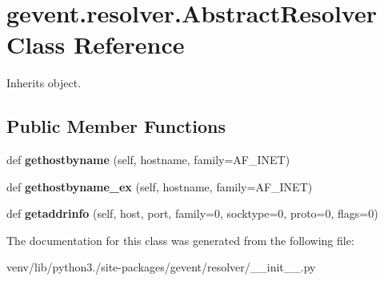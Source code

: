 \hypertarget{classgevent_1_1resolver_1_1_abstract_resolver}{}\section{gevent.\+resolver.\+Abstract\+Resolver Class Reference}
\label{classgevent_1_1resolver_1_1_abstract_resolver}


Inherits object.

\subsection*{Public Member Functions}
\begin{DoxyCompactItemize}
\item 
\mbox{\label{classgevent_1_1resolver_1_1_abstract_resolver_aacaf3bf5e0ce31fb42ac4c99cfc4573c}} 
def {\bfseries gethostbyname} (self, hostname, family=A\+F\+\_\+\+I\+N\+ET)
\item 
\mbox{\label{classgevent_1_1resolver_1_1_abstract_resolver_a952a6532b8a40b4272d3b4c0fc4d3e71}} 
def {\bfseries gethostbyname\+\_\+ex} (self, hostname, family=A\+F\+\_\+\+I\+N\+ET)
\item 
\mbox{\label{classgevent_1_1resolver_1_1_abstract_resolver_a144ad45f5f07b3e5261a635bfcf92b14}} 
def {\bfseries getaddrinfo} (self, host, port, family=0, socktype=0, proto=0, flags=0)
\end{DoxyCompactItemize}


The documentation for this class was generated from the following file\+:\begin{DoxyCompactItemize}
\item 
venv/lib/python3./site-\/packages/gevent/resolver/\+\_\+\+\_\+init\+\_\+\+\_\+.\+py\end{DoxyCompactItemize}
